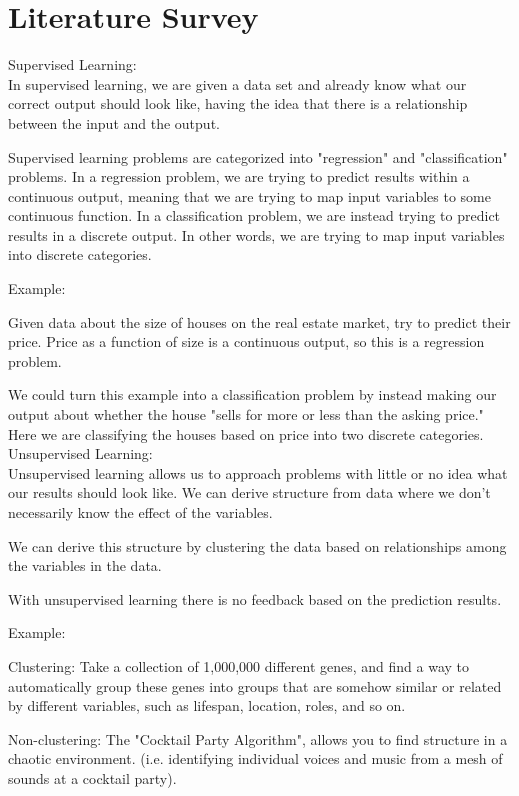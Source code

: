\section{Literature Survey} \label{sec:litsurvey}

Supervised Learning: \\

In supervised learning, we are given a data set and already know what our correct output should look like, having the idea that there is a relationship between the input and the output.

Supervised learning problems are categorized into "regression" and "classification" problems. In a regression problem, we are trying to predict results within a continuous output, meaning that we are trying to map input variables to some continuous function. In a classification problem, we are instead trying to predict results in a discrete output. In other words, we are trying to map input variables into discrete categories.

Example:

Given data about the size of houses on the real estate market, try to predict their price. Price as a function of size is a continuous output, so this is a regression problem.

We could turn this example into a classification problem by instead making our output about whether the house "sells for more or less than the asking price." Here we are classifying the houses based on price into two discrete categories. \\

\vspace{5mm}
Unsupervised Learning: \\

Unsupervised learning allows us to approach problems with little or no idea what our results should look like. We can derive structure from data where we don't necessarily know the effect of the variables.

We can derive this structure by clustering the data based on relationships among the variables in the data.

With unsupervised learning there is no feedback based on the prediction results.

Example:

Clustering: Take a collection of 1,000,000 different genes, and find a way to automatically group these genes into groups that are somehow similar or related by different variables, such as lifespan, location, roles, and so on.

Non-clustering: The "Cocktail Party Algorithm", allows you to find structure in a chaotic environment. (i.e. identifying individual voices and music from a mesh of sounds at a cocktail party).

\vspace{5mm}

